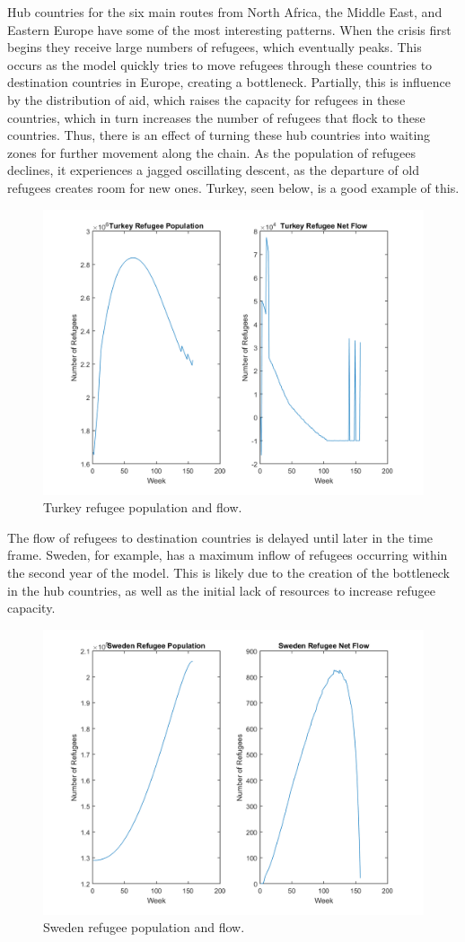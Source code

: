 \documentclass{article}
\begin{document}
Hub countries for the six main routes from North Africa, the Middle East, and Eastern Europe have some of the most interesting patterns. When the crisis first begins they receive large numbers of refugees, which eventually peaks. This occurs as the model quickly tries to move refugees through these countries to destination countries in Europe, creating a bottleneck. Partially, this is influence by the distribution of aid, which raises the capacity for refugees in these countries, which in turn increases the number of refugees that flock to these countries. Thus, there is an effect of turning these hub countries into waiting zones for further movement along the chain. As the population of refugees declines, it experiences a jagged oscillating descent, as the departure of old refugees creates room for new ones. Turkey, seen below, is a good example of this.

\begin{figure}[H]
    \centering
    \includegraphics[width=.7\textwidth]{PostRefugeePlots/Turkey_RefugeePopandFlow.png}
    \caption [width=0.9\textwidth]{\centering Turkey refugee population and flow.}
\end{figure}

The flow of refugees to destination countries is delayed until later in the time frame. Sweden, for example, has a maximum inflow of refugees occurring within the second year of the model. This is likely due to the creation of the bottleneck in the hub countries, as well as the initial lack of resources to increase refugee capacity.

\begin{figure}[H]
    \centering
    \includegraphics[width=.7\textwidth]{PostRefugeePlots/Sweden_RefugeePopandFlow.png}
    \caption [width=0.9\textwidth]{\centering Sweden refugee population and flow.}
\end{figure}
\end{document}
